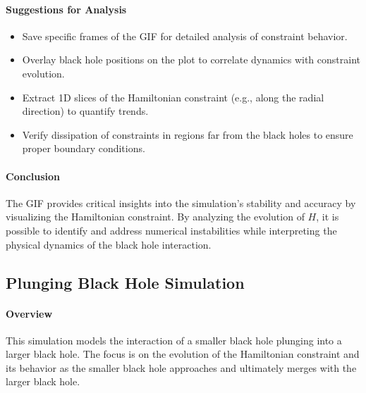 \documentclass[12pt]{article}
\begin{document}
\paragraph{Suggestions for Analysis}
\begin{itemize}
    \item Save specific frames of the GIF for detailed analysis of constraint behavior.
    \item Overlay black hole positions on the plot to correlate dynamics with constraint evolution.
    \item Extract 1D slices of the Hamiltonian constraint (e.g., along the radial direction) to quantify trends.
    \item Verify dissipation of constraints in regions far from the black holes to ensure proper boundary conditions.
\end{itemize}

\paragraph{Conclusion}
The GIF provides critical insights into the simulation's stability and accuracy by visualizing the Hamiltonian constraint. By analyzing the evolution of \( H \), it is possible to identify and address numerical instabilities while interpreting the physical dynamics of the black hole interaction.

\subsection{Plunging Black Hole Simulation}
\paragraph{Overview}
This simulation models the interaction of a smaller black hole plunging into a larger black hole. The focus is on the evolution of the Hamiltonian constraint and its behavior as the smaller black hole approaches and ultimately merges with the larger black hole.
\end{document}
